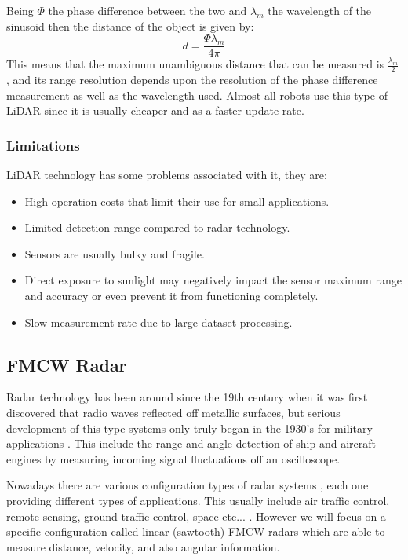 Being $\Phi$ the phase difference between the two and $\lambda_m$ the wavelength of the sinusoid then the distance of the object is given by:
\begin{equation}
    d=\frac{\Phi \lambda_m}{4 \pi}
\end{equation}
This means that the maximum unambiguous distance that can be measured is  $\frac{\lambda_m}{2}$, and its range resolution depends upon the resolution of the phase difference measurement as well as the wavelength used. Almost all robots use this type of \ac{LiDAR} since it is usually cheaper and as a faster update rate.

\subsubsection{Limitations}
\ac{LiDAR} technology has some problems associated with it, they are:
\begin{itemize}
\item{High operation costs that limit their use for small applications.}  
\item{Limited detection range compared to radar technology.}  
\item{Sensors are usually bulky and fragile.}  
\item{Direct exposure to sunlight may negatively impact the sensor maximum range and accuracy or even prevent it from functioning completely.} 
\item{Slow measurement rate due to large dataset processing.} 
\end{itemize}

\subsection{FMCW Radar}
\ac{Radar} technology has been around since the 19th century when it was first discovered that radio waves reflected off metallic surfaces, but serious development of this type systems only truly began in the 1930's for military applications \cite{radar_history}. This include the range and angle detection of ship and aircraft engines by measuring incoming signal fluctuations off an oscilloscope. 

Nowadays there are various configuration types of radar systems  \cite{types_radar}, each one providing different types of applications. This usually include air traffic control, remote sensing, ground traffic control, space etc... .  However we will focus on a specific configuration called linear (sawtooth)  \ac{FMCW} radars which are  able to measure distance, velocity, and also angular information. 

